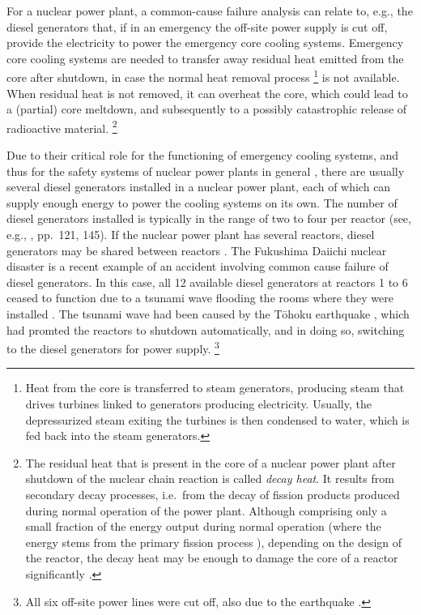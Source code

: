 For a nuclear power plant, a common-cause failure analysis can relate to, e.g.,
the diesel generators that, if in an emergency the off-site power supply is cut off,
provide the electricity to power the emergency core cooling systems.
Emergency core cooling systems are needed to transfer away residual heat emitted from the core after shutdown,
in case the normal heat removal process%
\footnote{Heat from the core is transferred to steam generators,
producing steam that drives turbines linked to generators producing electricity.
Usually, the depressurized steam exiting the turbines
is then condensed to water, which is fed back into the steam generators.}
is not available.
When residual heat is not removed, it can overheat the core,
which could lead to a (partial) core meltdown,
and subsequently to a possibly catastrophic release of radioactive material.%
\footnote{The residual heat that is present in the core of a nuclear power plant
after shutdown of the nuclear chain reaction is called \emph{decay heat}.
It results from secondary decay processes,
i.e.\ from the decay of fission products produced during normal operation of the power plant.
Although comprising only a small fraction of the energy output during normal operation
(where the energy stems from the primary fission process \parencite[Module~4, p.~33]{united1993doe}),
depending on the design of the reactor,
the decay heat may be enough to damage the core of a reactor significantly
\parencite[pp.~VIII-9 and VIII-25f]{1975:reactor:safety:study}.}

Due to their critical role for the functioning of emergency cooling systems,
and thus for the safety systems of nuclear power plants in general \parencite[pp.~1, 4]{csni86-115},
there are usually several diesel generators installed in a nuclear power plant,
each of which can supply enough energy to power the cooling systems on its own.
The number of diesel generators installed is typically in the range of two to four per reactor
(see, e.g., \textcite{csni86-115}, pp.~121, 145).
If the nuclear power plant has several reactors, diesel generators may be shared between reactors \parencite[p.~7]{2004:iaea::emergencypower}.
The Fukushima Daiichi nuclear disaster is a recent example of an accident
involving common cause failure of diesel generators.
In this case, all 12 available diesel generators at reactors 1 to 6 
ceased to function due to a tsunami wave flooding the rooms where they were installed \parencite[p.~31]{2011:iaea::report}.
The tsunami wave had been caused by the T\={o}hoku earthquake \parencite[e.g.,][]{2012:ritsema},
which had promted the reactors to shutdown automatically, and in doing so,
switching to the diesel generators for power supply.%
\footnote{All six off-site power lines were cut off, also due to the earthquake \parencite[p.~31]{2011:iaea::report}.}

